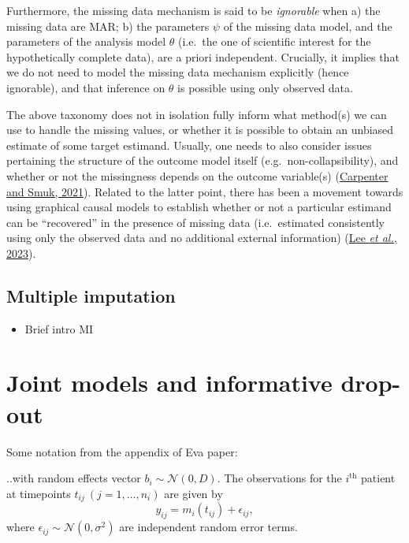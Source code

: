 \documentclass[
  letterpaper,
  DIV=11,
  numbers=noendperiod]{scrreprt}
\providecommand{\tightlist}{%
  \setlength{\itemsep}{0pt}\setlength{\parskip}{0pt}}\usepackage{longtable,booktabs,array}
\begin{document}
Furthermore, the missing data mechanism is said to be \emph{ignorable}
when a) the missing data are MAR; b) the parameters \(\psi\) of the
missing data model, and the parameters of the analysis model \(\theta\)
(i.e.~the one of scientific interest for the hypothetically complete
data), are a priori independent. Crucially, it implies that we do not
need to model the missing data mechanism explicitly (hence ignorable),
and that inference on \(\theta\) is possible using only observed data.

The above taxonomy does not in isolation fully inform what method(s) we
can use to handle the missing values, or whether it is possible to
obtain an unbiased estimate of some target estimand. Usually, one needs
to also consider issues pertaining the structure of the outcome model
itself (e.g.~non-collapsibility), and whether or not the missingness
depends on the outcome variable(s)
(\protect\hyperlink{ref-carpenterMissingDataStatistical2021}{Carpenter
and Smuk, 2021}). Related to the latter point, there has been a movement
towards using graphical causal models to establish whether or not a
particular estimand can be ``recovered'' in the presence of missing data
(i.e.~estimated consistently using only the observed data and no
additional external information)
(\protect\hyperlink{ref-leeAssumptionsAnalysisPlanning2023}{Lee \emph{et
al.}, 2023}).

\hypertarget{multiple-imputation}{%
\subsection{Multiple imputation}\label{multiple-imputation}}

\begin{itemize}
\tightlist
\item
  Brief intro MI
\end{itemize}

\hypertarget{sec-intro-jms}{%
\section{Joint models and informative drop-out}\label{sec-intro-jms}}

Some notation from the appendix of Eva paper:

..with random effects vector \(b_{i} \sim \mathcal{N}(0, D)\). The
observations for the \(i^{\text{th}}\) patient at timepoints
\(t_{ij} \ (j = 1,\ldots,n_i)\) are given by \[
y_{ij} = m_i(t_{ij}) + \epsilon_{ij},
\] where \(\epsilon_{ij} \sim \mathcal{N}(0, \sigma^2)\) are independent
random error terms.
\end{document}
